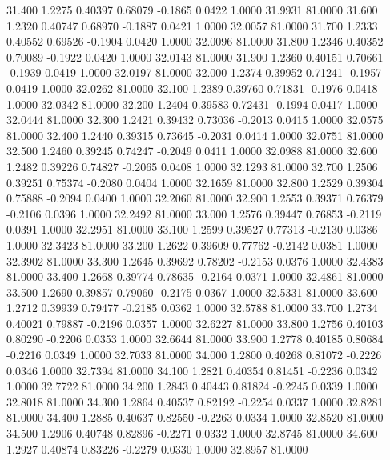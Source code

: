   31.400   1.2275   0.40397   0.68079  -0.1865   0.0422   1.0000  31.9931  81.0000
  31.600   1.2320   0.40747   0.68970  -0.1887   0.0421   1.0000  32.0057  81.0000
  31.700   1.2333   0.40552   0.69526  -0.1904   0.0420   1.0000  32.0096  81.0000
  31.800   1.2346   0.40352   0.70089  -0.1922   0.0420   1.0000  32.0143  81.0000
  31.900   1.2360   0.40151   0.70661  -0.1939   0.0419   1.0000  32.0197  81.0000
  32.000   1.2374   0.39952   0.71241  -0.1957   0.0419   1.0000  32.0262  81.0000
  32.100   1.2389   0.39760   0.71831  -0.1976   0.0418   1.0000  32.0342  81.0000
  32.200   1.2404   0.39583   0.72431  -0.1994   0.0417   1.0000  32.0444  81.0000
  32.300   1.2421   0.39432   0.73036  -0.2013   0.0415   1.0000  32.0575  81.0000
  32.400   1.2440   0.39315   0.73645  -0.2031   0.0414   1.0000  32.0751  81.0000
  32.500   1.2460   0.39245   0.74247  -0.2049   0.0411   1.0000  32.0988  81.0000
  32.600   1.2482   0.39226   0.74827  -0.2065   0.0408   1.0000  32.1293  81.0000
  32.700   1.2506   0.39251   0.75374  -0.2080   0.0404   1.0000  32.1659  81.0000
  32.800   1.2529   0.39304   0.75888  -0.2094   0.0400   1.0000  32.2060  81.0000
  32.900   1.2553   0.39371   0.76379  -0.2106   0.0396   1.0000  32.2492  81.0000
  33.000   1.2576   0.39447   0.76853  -0.2119   0.0391   1.0000  32.2951  81.0000
  33.100   1.2599   0.39527   0.77313  -0.2130   0.0386   1.0000  32.3423  81.0000
  33.200   1.2622   0.39609   0.77762  -0.2142   0.0381   1.0000  32.3902  81.0000
  33.300   1.2645   0.39692   0.78202  -0.2153   0.0376   1.0000  32.4383  81.0000
  33.400   1.2668   0.39774   0.78635  -0.2164   0.0371   1.0000  32.4861  81.0000
  33.500   1.2690   0.39857   0.79060  -0.2175   0.0367   1.0000  32.5331  81.0000
  33.600   1.2712   0.39939   0.79477  -0.2185   0.0362   1.0000  32.5788  81.0000
  33.700   1.2734   0.40021   0.79887  -0.2196   0.0357   1.0000  32.6227  81.0000
  33.800   1.2756   0.40103   0.80290  -0.2206   0.0353   1.0000  32.6644  81.0000
  33.900   1.2778   0.40185   0.80684  -0.2216   0.0349   1.0000  32.7033  81.0000
  34.000   1.2800   0.40268   0.81072  -0.2226   0.0346   1.0000  32.7394  81.0000
  34.100   1.2821   0.40354   0.81451  -0.2236   0.0342   1.0000  32.7722  81.0000
  34.200   1.2843   0.40443   0.81824  -0.2245   0.0339   1.0000  32.8018  81.0000
  34.300   1.2864   0.40537   0.82192  -0.2254   0.0337   1.0000  32.8281  81.0000
  34.400   1.2885   0.40637   0.82550  -0.2263   0.0334   1.0000  32.8520  81.0000
  34.500   1.2906   0.40748   0.82896  -0.2271   0.0332   1.0000  32.8745  81.0000
  34.600   1.2927   0.40874   0.83226  -0.2279   0.0330   1.0000  32.8957  81.0000
